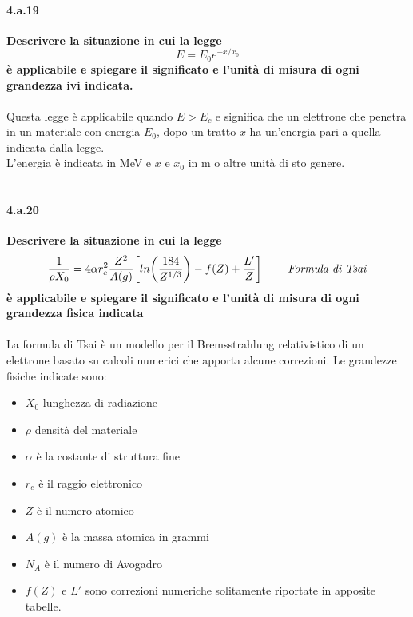\documentclass[twoside]{article}
\begin{document}
\paragraph{4.a.19}\textbf{Descrivere la situazione in cui la legge 
\begin{equation}
    E=E_0 e^{-x/x_0}
\end{equation}
è applicabile e spiegare il
significato e l'unità di misura di ogni grandezza ivi indicata.}\\ \\

Questa legge è applicabile quando $E>E_c$ e significa che un elettrone che penetra in un materiale con energia $E_0$, dopo un tratto $x$ ha un'energia pari a quella indicata dalla legge.
\\
L'energia è indicata in MeV e $x$ e $x_0$ in m o altre unità di sto genere.
\\ \\
\paragraph{4.a.20}\textbf{Descrivere la situazione in cui la legge}
\begin{equation*}
    \frac{1}{\rho X_0}=4\alpha r_e^2\frac{Z^2}{A(g)}\biggl[ln\biggl(\frac{184}{Z^{1/3}}\biggr)-f(Z)+\frac{L'}{Z}\biggr]\ \ \ \ \ \ \ \text{\textit{Formula di Tsai}}
\end{equation*}
\textbf{è applicabile e spiegare il significato e l'unità di misura di ogni grandezza fisica indicata}\\ \\
La formula di Tsai è un modello per il Bremsstrahlung relativistico di un elettrone basato su calcoli numerici che apporta alcune correzioni. Le grandezze fisiche indicate sono:
\begin{itemize}
    \item $X_0$ lunghezza di radiazione
    \item $\rho$ densità del materiale
    \item $\alpha$ è la costante di struttura fine
    \item $r_e$ è il raggio elettronico
    \item $Z$ è il numero atomico
    \item $A(g)$ è la massa atomica in grammi
    \item $N_A$ è il numero di Avogadro
    \item $f(Z)$ e $L'$ sono correzioni numeriche solitamente riportate in apposite tabelle.
\end{itemize}
\end{document}
